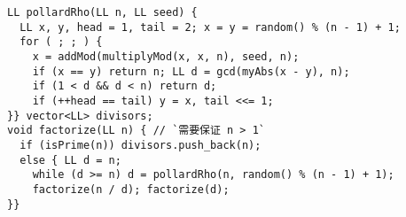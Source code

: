 \begin{lstlisting}
LL pollardRho(LL n, LL seed) {
  LL x, y, head = 1, tail = 2; x = y = random() % (n - 1) + 1;
  for ( ; ; ) {
    x = addMod(multiplyMod(x, x, n), seed, n);
    if (x == y) return n; LL d = gcd(myAbs(x - y), n);
    if (1 < d && d < n) return d;
    if (++head == tail) y = x, tail <<= 1;
}} vector<LL> divisors;
void factorize(LL n) { // `需要保证 n > 1`
  if (isPrime(n)) divisors.push_back(n);
  else { LL d = n;
    while (d >= n) d = pollardRho(n, random() % (n - 1) + 1);
    factorize(n / d); factorize(d);
}}
\end{lstlisting}